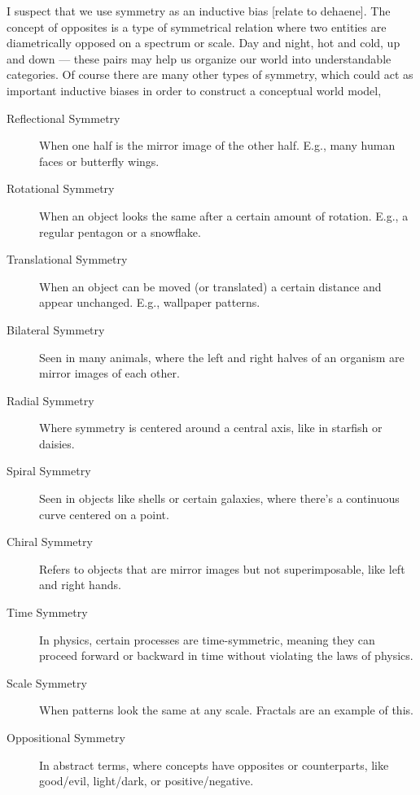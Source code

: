





I suspect that we use symmetry as an inductive bias [relate to dehaene]. The concept of opposites is a type of symmetrical relation where two entities are diametrically opposed on a spectrum or scale. Day and night, hot and cold, up and down — these pairs may help us organize our world into understandable categories. Of course there are many other types of symmetry, which could act as important inductive biases in order to construct a conceptual world model, 
\begin{description}
    \item[Reflectional Symmetry] When one half is the mirror image of the other half. E.g., many human faces or butterfly wings.
    \item[Rotational Symmetry] When an object looks the same after a certain amount of rotation. E.g., a regular pentagon or a snowflake.
    \item[Translational Symmetry] When an object can be moved (or translated) a certain distance and appear unchanged. E.g., wallpaper patterns.
    \item[Bilateral Symmetry] Seen in many animals, where the left and right halves of an organism are mirror images of each other.
    \item[Radial Symmetry] Where symmetry is centered around a central axis, like in starfish or daisies.
    \item[Spiral Symmetry] Seen in objects like shells or certain galaxies, where there's a continuous curve centered on a point.
    \item[Chiral Symmetry] Refers to objects that are mirror images but not superimposable, like left and right hands.
    \item[Time Symmetry] In physics, certain processes are time-symmetric, meaning they can proceed forward or backward in time without violating the laws of physics.
    \item[Scale Symmetry] When patterns look the same at any scale. Fractals are an example of this.
    \item[Oppositional Symmetry] In abstract terms, where concepts have opposites or counterparts, like good/evil, light/dark, or positive/negative.
\end{description} 

